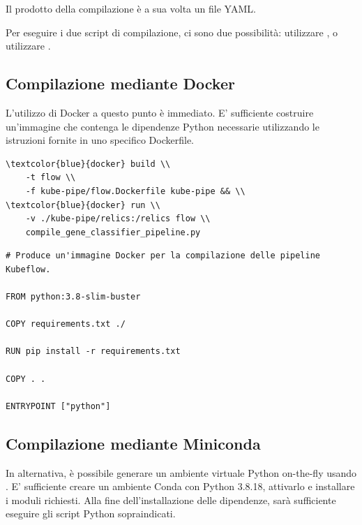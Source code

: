Il prodotto della compilazione è a sua volta un file YAML.

Per eseguire i due script di compilazione, ci sono due possibilità: utilizzare , o utilizzare . 

\subsection{Compilazione mediante Docker}

L'utilizzo di Docker a questo punto è immediato. E' sufficiente costruire un'immagine che contenga le dipendenze Python necessarie utilizzando le istruzioni fornite in uno specifico Dockerfile.

\begin{small}
\begin{Verbatim}[commandchars=\\\{\}]
\textcolor{blue}{docker} build \\
    -t flow \\
    -f kube-pipe/flow.Dockerfile kube-pipe && \\
\textcolor{blue}{docker} run \\
    -v ./kube-pipe/relics:/relics flow \\
    compile_gene_classifier_pipeline.py
\end{Verbatim}
\end{small}

\begin{code}
\label{code:apx:a:dockerfile}
\begin{verbatim}
# Produce un'immagine Docker per la compilazione delle pipeline Kubeflow.

FROM python:3.8-slim-buster

COPY requirements.txt ./

RUN pip install -r requirements.txt

COPY . .

ENTRYPOINT ["python"]
\end{verbatim}
\end{code}

\subsection{Compilazione mediante Miniconda}

In alternativa, è possibile generare un ambiente virtuale Python on-the-fly usando . E' sufficiente creare un ambiente Conda con Python 3.8.18, attivarlo e installare i moduli richiesti. Alla fine dell'installazione delle dipendenze, sarà sufficiente eseguire gli script Python sopraindicati.

